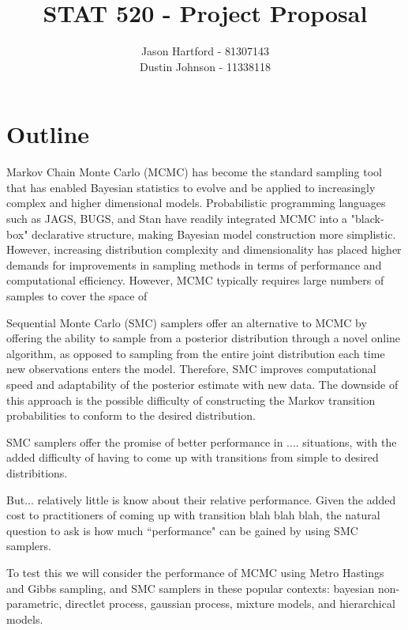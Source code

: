 \documentclass[11pt, oneside]{amsart}
\title{STAT 520 - Project Proposal}
\author{Jason Hartford - 81307143 \\
Dustin Johnson - 11338118}
\begin{document}
\maketitle


\section{Outline}

Markov Chain Monte Carlo (MCMC) has become the standard sampling tool that has enabled Bayesian statistics to evolve and be applied to increasingly complex and higher dimensional models. Probabilistic programming languages such as JAGS, BUGS, and Stan have readily integrated MCMC into a "black-box" declarative structure, making Bayesian model construction more simplistic. However, increasing distribution complexity and dimensionality has placed higher demands for improvements in sampling methods in terms of performance and computational efficiency.  However, MCMC typically requires large numbers of samples to cover the space of
	
Sequential Monte Carlo (SMC) samplers offer an alternative to MCMC by offering the ability to sample from a posterior distribution through a novel online algorithm, as opposed to sampling from the entire joint distribution each time new observations enters the model. Therefore, SMC improves computational speed and adaptability of the posterior estimate with new data. The downside of this approach is the possible difficulty of constructing the Markov transition probabilities to conform to the desired distribution. 


SMC samplers offer the promise of better performance in .... situations, with the added difficulty of having to come up with transitions from simple to desired distribitions.

But... relatively little is know about their relative performance. Given the added cost to practitioners of coming up with transition blah blah blah, the natural question to ask is how much ``performance" can be gained by using SMC samplers.

To test this we will consider the performance of MCMC using Metro Hastings and Gibbs sampling, and SMC samplers in these popular contexts: bayesian non-parametric, directlet process, gaussian process, mixture models, and hierarchical models.

% 
\end{document}

